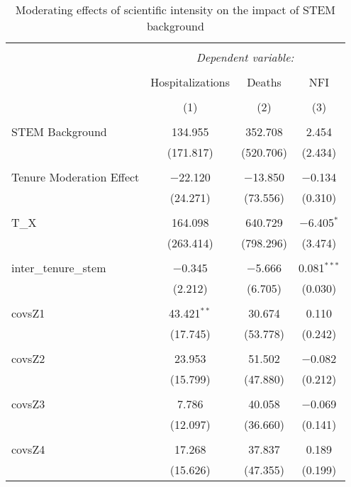 
\begin{table}[!htbp] \centering 
  \caption{Moderating effects of scientific intensity on the impact of STEM background} 
  \label{} 
\begin{tabular}{@{\extracolsep{5pt}}lccc} 
\\[-1.8ex]\hline 
\hline \\[-1.8ex] 
 & \multicolumn{3}{c}{\textit{Dependent variable:}} \\ 
\cline{2-4} 
\\[-1.8ex] & Hospitalizations & Deaths & NFI \\ 
\\[-1.8ex] & (1) & (2) & (3)\\ 
\hline \\[-1.8ex] 
 STEM Background & 134.955 & 352.708 & 2.454 \\ 
  & (171.817) & (520.706) & (2.434) \\ 
  & & & \\ 
 Tenure Moderation Effect & $-$22.120 & $-$13.850 & $-$0.134 \\ 
  & (24.271) & (73.556) & (0.310) \\ 
  & & & \\ 
 T\_X & 164.098 & 640.729 & $-$6.405$^{*}$ \\ 
  & (263.414) & (798.296) & (3.474) \\ 
  & & & \\ 
 inter\_tenure\_stem & $-$0.345 & $-$5.666 & 0.081$^{***}$ \\ 
  & (2.212) & (6.705) & (0.030) \\ 
  & & & \\ 
 covsZ1 & 43.421$^{**}$ & 30.674 & 0.110 \\ 
  & (17.745) & (53.778) & (0.242) \\ 
  & & & \\ 
 covsZ2 & 23.953 & 51.502 & $-$0.082 \\ 
  & (15.799) & (47.880) & (0.212) \\ 
  & & & \\ 
 covsZ3 & 7.786 & 40.058 & $-$0.069 \\ 
  & (12.097) & (36.660) & (0.141) \\ 
  & & & \\ 
 covsZ4 & 17.268 & 37.837 & 0.189 \\ 
  & (15.626) & (47.355) & (0.199) \\ 

\end{tabular}
\end{table}
